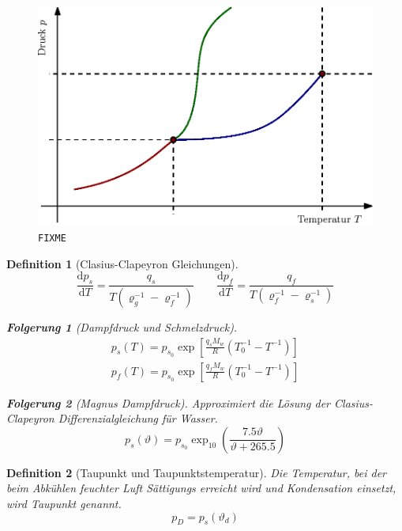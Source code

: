\documentclass[a4paper, twocolumn]{article}
\numberwithin{equation}{section}
\theoremstyle{hsr-def}
\newtheorem{definition}{Definition}[section]
\theoremstyle{hsr-sub}
\newtheorem{result}{Folgerung}[definition]
\newcommand{\dd}[1]{\ensuremath{\mathrm{d}#1}}
\newcommand{\deriv}[2]{\ensuremath{\frac{\dd{#1}}{\dd{#2}}}}
\begin{document}
\begin{figure}[h]
    \includegraphics[width=\linewidth]{fig/phase-diagram}%
    \caption{\tt FIXME}
\end{figure}

\begin{definition}[Clasius-Clapeyron Gleichungen]
\[
    \deriv{p_s}{T} =
        \frac{q_s}{T\left(\varrho_g^{-1} - \varrho_f^{-1}\right)}
    \qquad
    \deriv{p_f}{T} =
        \frac{q_f}{T\left(\varrho_f^{-1} - \varrho_s^{-1}\right)}
\]
\begin{result}[Dampfdruck und Schmelzdruck]
\begin{gather*}
    p_s(T) = p_{s_0} \exp\left[
        \frac{q_s M_w}{R} \left(
            T_0^{-1} - T^{-1}
        \right)
    \right] \\
    p_f(T) = p_{s_0} \exp\left[
        \frac{q_f M_w}{R} \left(
            T_0^{-1} - T^{-1}
        \right)
    \right]
\end{gather*}
\end{result}

\begin{result}[Magnus Dampfdruck] Approximiert die L\"osung der Clasius-Clapeyron Differenzialgleichung f\"ur Wasser.
\[
    p_s(\vartheta) = p_{s_0}
        \exp_{10}\left({\frac{7.5\vartheta}{\vartheta + 265.5}}\right)
\]
\end{result}
\end{definition}

\begin{definition}[Taupunkt und Taupunktstemperatur]
Die Temperatur, bei der beim Abk\"uhlen feuchter Luft S\"attigungs erreicht wird und Kondensation einsetzt, wird \emph{Taupunkt} genannt.
\[
    p_D = p_s (\vartheta_d)
\]
\end{definition}
\end{document}

